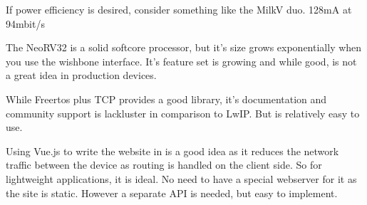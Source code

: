 If power efficiency is desired, consider something like the MilkV duo. 128mA at 94mbit/s

The NeoRV32 is a solid softcore processor, but it's size grows exponentially when you use the wishbone interface. It's feature set is growing and while good, is not a great idea in production devices. 


While Freertos plus TCP provides a good library, it's documentation and community support is lackluster in comparison to LwIP. But is relatively easy to use. 

Using Vue.js to write the website in is a good idea as it reduces the network traffic between the device as routing is handled on the client side. So for lightweight applications, it is ideal. No need to have a special webserver for it as the site is static. However a separate API is needed, but easy to implement. 
